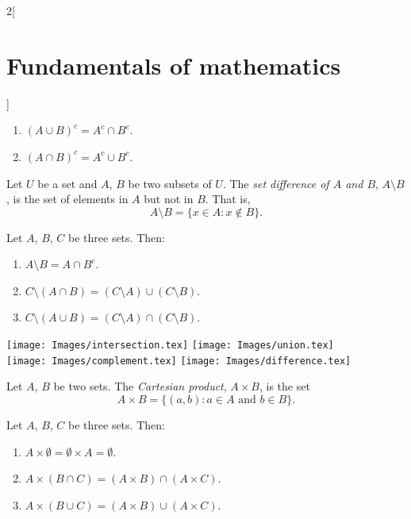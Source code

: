 \documentclass[../../../main.tex]{subfiles}
\begin{document}
\begin{multicols}{2}[\section{Fundamentals of mathematics}]
\begin{prop}
        \begin{enumerate}
            \item $(A\cup B)^c=A^c\cap B^c$.
            \item $(A\cap B)^c=A^c\cup B^c$.
        \end{enumerate}
    \end{prop}
    \begin{definition}
        Let $U$ be a set and $A$, $B$ be two subsets of $U$. The \textit{set difference of $A$ and $B$}, $A\setminus B$, is the set of elements in $A$ but not in $B$. That is, $$A\setminus B=\{x\in A:x\notin B\}.$$
    \end{definition}
    \begin{prop}
        Let $A$, $B$, $C$ be three sets. Then:
        \begin{enumerate}
            \item $A\setminus B=A\cap B^c$.
            \item $C\setminus(A\cap B)=(C\setminus A)\cup (C\setminus B)$.
            \item $C\setminus(A\cup B)=(C\setminus A)\cap (C\setminus B)$.
        \end{enumerate}
    \end{prop}
    \begin{center}
        \texttt{[image: Images/intersection.tex]}\hfill
        \texttt{[image: Images/union.tex]}\\
        \vspace{0.02\linewidth}
        \texttt{[image: Images/complement.tex]}\hfill
        \texttt{[image: Images/difference.tex]}
    \end{center}
    \begin{definition}
        Let $A$, $B$ be two sets. The \textit{Cartesian product}, $A\times B$, is the set $$A\times B=\{(a,b): a\in A\text{ and }b\in B\}.$$
    \end{definition}
    \begin{prop}
        Let $A$, $B$, $C$ be three sets. Then:
        \begin{enumerate}
            \item $A\times \emptyset=\emptyset\times A=\emptyset$.
            \item $A\times(B\cap C)=(A\times B)\cap(A\times C)$.
            \item $A\times(B\cup C)=(A\times B)\cup(A\times C)$.

\end{enumerate}
\end{prop}
\end{multicols}
\end{document}
